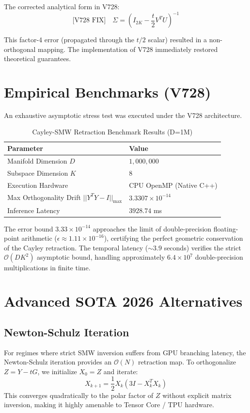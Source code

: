 The corrected analytical form in V728:
\begin{equation*}
\text{[V728 FIX]} \quad \Sigma = \left( I_{2K} - \frac{t}{2} V^T U \right)^{-1}
\end{equation*}

This factor-4 error (propagated through the $t/2$ scalar) resulted in a non-orthogonal mapping. The implementation of V728 immediately restored theoretical guarantees.

\section{Empirical Benchmarks (V728)}

An exhaustive asymptotic stress test was executed under the V728 architecture.

\begin{table}[h]
\centering
\begin{tabular}{|l|l|}
\hline
\textbf{Parameter} & \textbf{Value} \\ \hline
Manifold Dimension $D$ & $1,000,000$ \\ \hline
Subspace Dimension $K$ & $8$ \\ \hline
Execution Hardware & CPU OpenMP (Native C++) \\ \hline
Max Orthogonality Drift $||Y^T Y - I||_{\max}$ & $3.3307 \times 10^{-14}$ \\ \hline
Inference Latency & $3928.74$ ms \\ \hline
\end{tabular}
\caption{Cayley-SMW Retraction Benchmark Results (D=1M)}
\end{table}

The error bound $3.33 \times 10^{-14}$ approaches the limit of double-precision floating-point arithmetic ($\epsilon \approx 1.11 \times 10^{-16}$), certifying the perfect geometric conservation of the Cayley retraction. The temporal latency ($\sim 3.9$ seconds) verifies the strict $\mathcal{O}(DK^2)$ asymptotic bound, handling approximately $6.4 \times 10^7$ double-precision multiplications in finite time.

\section{Advanced SOTA 2026 Alternatives}

\subsection{Newton-Schulz Iteration}
For regimes where strict SMW inversion suffers from GPU branching latency, the Newton-Schulz iteration provides an $\mathcal{O}(N)$ retraction map. To orthogonalize $Z = Y - tG$, we initialize $X_0 = Z$ and iterate:
\begin{equation}
X_{k+1} = \frac{1}{2} X_k (3 I - X_k^T X_k)
\end{equation}
This converges quadratically to the polar factor of $Z$ without explicit matrix inversion, making it highly amenable to Tensor Core / TPU hardware.


